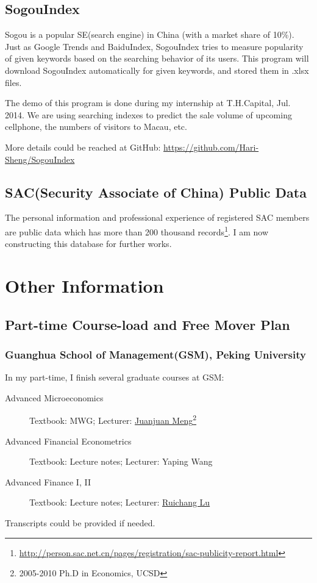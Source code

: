 \documentclass{article}
\begin{document}
\subsection{SogouIndex}
Sogou is a popular SE(search engine) in China (with a market share of 10\%). Just as Google Trends and BaiduIndex, SogouIndex tries to measure popularity of given keywords based on the searching behavior of its users. This program will download SogouIndex automatically for given keywords, and stored them in .xlsx files.

The demo of this program is done during my internship at T.H.Capital, Jul. 2014. We are using searching indexes to predict the sale volume of upcoming cellphone, the numbers of visitors to Macau, etc. 

More details could be reached at GitHub: \url{https://github.com/Hari-Sheng/SogouIndex}

\subsection{SAC(Security Associate of China) Public Data}
The personal information and professional experience of registered SAC members are public data which has more than 200 thousand records\footnote{\url{http://person.sac.net.cn/pages/registration/sac-publicity-report.html}}. I am now constructing this database for further works.

\newpage
\section{Other Information}
\subsection{Part-time Course-load and Free Mover Plan}
\subsubsection{Guanghua School of Management(GSM), Peking University}
In my part-time, I finish several graduate courses at GSM:
\begin{description}
\item[Advanced Microeconomics] Textbook: MWG; Lecturer: \href{https://ideas.repec.org/f/pme419.html}{Juanjuan Meng}\footnote{2005-2010 Ph.D in Economics, UCSD}
\item[Advanced Financial Econometrics] Textbook: Lecture notes; Lecturer: Yaping Wang
\item[Advanced Finance I, II] Textbook: Lecture notes; Lecturer: \href{https://ideas.repec.org/f/plu286.html}{Ruichang Lu}
\end{description}
Transcripts could be provided if needed.
\end{document}
